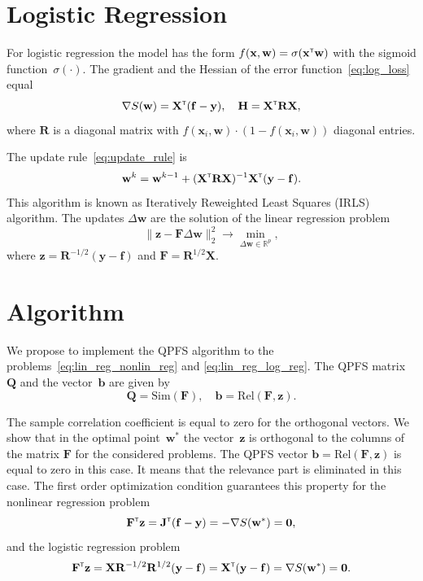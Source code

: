 \documentclass[a4paper,12pt]{article}
\theoremstyle{plain} %
\theoremstyle{definition} %
\theoremstyle{remark} %
\newcommand{\bb}{\mathbf{b}}
\newcommand{\bw}{\mathbf{w}}
\newcommand{\by}{\mathbf{y}}
\newcommand{\bx}{\mathbf{x}}
\newcommand{\bz}{\mathbf{z}}
\newcommand{\bJ}{\mathbf{J}}
\newcommand{\bQ}{\mathbf{Q}}
\newcommand{\bbR}{\mathbb{R}}
\newcommand{\bH}{\mathbf{H}}
\newcommand{\bF}{\mathbf{F}}
\newcommand{\bR}{\mathbf{R}}
\newcommand{\bX}{\mathbf{X}}
\newcommand{\T}{{\text{\tiny\sffamily\upshape\mdseries T}}}
\begin{document}
	\section*{Logistic Regression}
	For logistic regression the model has the form $f(\bx , \bw) = \sigma(\bx^{\T} \bw)$ with the sigmoid function~$\sigma(\cdot)$.
The gradient and the Hessian of the error function~\eqref{eq:log_loss} equal
\begin{equation}
\nabla S(\bw) = \bX^{\T} (\mathbf{f} - \by), \quad \bH = \bX^{\T} \bR \bX,
\label{eq:log_reg_deriv}
\end{equation}
where $\bR$ is a diagonal matrix with $f(\bx_i , \bw) \cdot (1 - f(\bx_i , \bw))$ diagonal entries.

The update rule~\eqref{eq:update_rule} is
\[
\bw^k = \bw^{k - 1} + (\bX^{\T} \bR \bX)^{-1} \bX^{\T} (\by - \mathbf{f}).
\]
This algorithm is known as Iteratively Reweighted Least Squares (IRLS) algorithm. The updates $\Delta \bw$ are the solution of the linear regression problem
\begin{equation}
\| \bz - \bF \Delta \bw \|_2^2 \rightarrow \min_{\Delta \bw \in \bbR^{p}},
\label{eq:lin_reg_log_reg}
\end{equation}
where $\bz = \bR^{-1/2} (\by - \mathbf{f})$ and $\bF = \bR^{1/2}\bX$.

	\section*{Algorithm}

We propose to implement the QPFS algorithm to the problems~\eqref{eq:lin_reg_nonlin_reg} and \eqref{eq:lin_reg_log_reg}. 
The QPFS matrix~$\bQ$ and the vector~$\bb$ are given by
\[
\bQ = \text{Sim} (\bF), \quad \bb = \text{Rel} (\bF, \bz).
\]

The sample correlation coefficient is equal to zero for the orthogonal vectors.
We show that in the optimal point~$\bw^*$ the vector~$\bz$ is orthogonal to the columns of the matrix $\bF$ for the considered problems. 
The QPFS vector $\bb = \text{Rel} (\bF, \bz)$ is equal to zero in this case. It means that the relevance part is eliminated in this case.
The first order optimization condition guarantees this property for the nonlinear regression problem
\[
\bF^{\T} \bz = \bJ^{\T} (\mathbf{f} - \by) = - \nabla S(\bw^*) = \boldsymbol{0},
\]
and the logistic regression problem
\[
\bF^{\T} \bz = \bX \bR^{-1/2} \bR^{1/2} (\by - \mathbf{f}) = \bX^{\T} (\by - \mathbf{f}) = \nabla S(\bw^*) = \boldsymbol{0}.
\]
\end{document}
